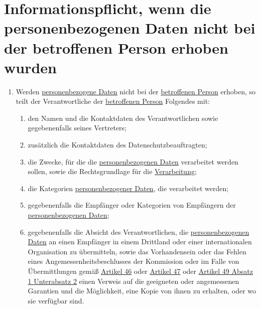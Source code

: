 \chapter{Informationspflicht, wenn die personenbezogenen Daten nicht bei der betroffenen Person erhoben wurden}
\label{ch:14}


\begin{enumerate}

  \item Werden \hyperref[itm:04-1]{personenbezogene Daten} nicht bei der \hyperref[itm:04-1]{betroffenen Person} erhoben, so teilt der Verantwortliche der
   \hyperref[itm:04-1]{betroffenen Person} Folgendes mit:
  \label{itm:14-1}

  \begin{enumerate}
  
    \item den Namen und die Kontaktdaten des Verantwortlichen sowie gegebenenfalls seines Vertreters;
    \label{itm:14-1a}

    \item zusätzlich die Kontaktdaten des Datenschutzbeauftragten;
    \label{itm:14-1b}

    \item die Zwecke, für die die \hyperref[itm:04-1]{personenbezogenen Daten} verarbeitet werden sollen, sowie die Rechtsgrundlage für die
     \hyperref[itm:04-2]{Verarbeitung};
    \label{itm:14-1c}

    \item die Kategorien \hyperref[itm:04-1]{personenbezogener Daten}, die verarbeitet werden;
    \label{itm:14-1d}

    \item gegebenenfalls die Empfänger oder Kategorien von Empfängern der \hyperref[itm:04-1]{personenbezogenen Daten};
    \label{itm:14-1e}

    \item gegebenenfalls die Absicht des Verantwortlichen, die \hyperref[itm:04-1]{personenbezogenen Daten} an einen Empfänger in einem
     Drittland oder einer internationalen Organisation zu übermitteln, sowie das Vorhandensein oder das Fehlen eines
     Angemessenheitsbeschlusses der Kommission oder im Falle von Übermittlungen gemäß \hyperref[ch:46]{Artikel 46} oder
     \hyperref[ch:47]{Artikel 47} oder \hyperref[itm:49-1-2]{Artikel 49 Absatz 1 Unterabsatz 2} einen Verweis auf die
      geeigneten oder angemessenen Garantien und die Möglichkeit, eine Kopie von ihnen zu erhalten, oder wo sie
      verfügbar sind.
    \label{itm:14-1f}


\end{enumerate}
\end{enumerate}

